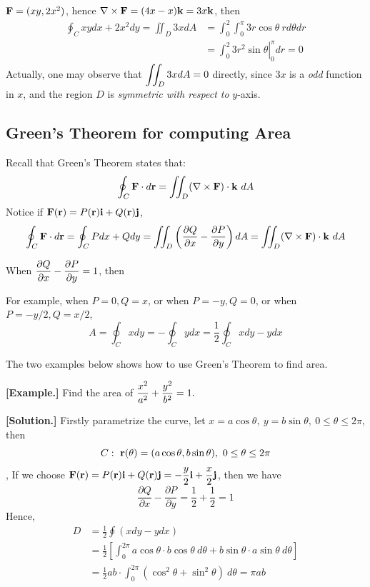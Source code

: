 \documentclass[11pt, a4paper]{MATH2023}
\newcommand{\eg}{\textbf{[Example.] }}
\newcommand{\sol}{\textbf{[Solution.] }}
\newcommand{\ii}{{\bf i}}
\newcommand{\jj}{{\bf j}}
\newcommand{\kk}{{\bf k}}
\newcommand{\rr}{{\bf r}}
\newcommand{\FF}{{\bf F}}
\newcommand{\pt}{\partial}
\begin{document}
\begin{spacing}{1.3}
    $\FF=(xy, 2x^2)$, hence $\nabla \times \FF=(4x-x)\kk =3x\kk$, then
    \begin{align*}
        \oint_{C} x y d x+2 x^{2} d y = \iint_D 3x dA &=\int_0^2\int_0^{\pi} 3r\cos\theta \ rd\theta dr \\
            &= \left. \int_0^2 3r^2\sin\theta \right|_0^{\pi} dr=0
    \end{align*}
    Actually, one may observe that $\displaystyle \iint_D 3x dA=0$ directly, since $3x$ is a {\it odd} function in 
    $x$, and the region $D$ is {\it symmetric with respect to }$y$-axis.



    \newpage
    \subsection{Green's Theorem for computing Area}

    Recall that Green's Theorem states that:
    $$\oint_C \FF\cdot d\rr=\iint_D (\nabla \times \FF)\cdot \kk\ dA$$
    Notice if $\FF(\rr)=P(\rr)\ii+Q(\rr)\jj$,
    $$\oint_{C} \mathbf{F} \cdot d \mathbf{r}=\oint_{C} P d x+Q d y
    =\iint_{D}\left(\frac{\partial Q}{\partial x}-\frac{\partial P}{\partial y}\right) d A
    =\iint_D (\nabla \times \FF)\cdot \kk\ dA$$

    When $\disp \frac{\pt Q}{\pt x}-\frac{\pt P}{\pt y}=1$, then 
    \begin{center}
    \end{center}

    For example, when $P=0, Q=x$, or when $P=-y, Q=0$, or when $P=-y/2, Q=x/2$,
    $$A=\oint_C xdy=-\oint_C ydx=\frac{1}{2}\oint_C xdy-ydx$$



    \newpage
    {\blue The two examples below shows how to use Green's Theorem to find area.}

    \eg Find the area of $\displaystyle \frac{x^2}{a^2}+\frac{y^2}{b^2}=1.$

    \sol Firstly parametrize the curve, let $x=a\cos\theta,\ y=b\sin\theta,\ 0\le \theta\le 2\pi$, then 
    $$C:\ \rr(\theta)=(a\cos\theta, b\sin\theta),\ 0\le \theta\le 2\pi$$,
    If we choose $\disp \FF(\rr)=P(\rr)\ii+Q(\rr)\jj=-\frac{y}{2}\ii+\frac{x}{2}\jj$, then we have
    $$\frac{\pt Q}{\pt x}-\frac{\pt P}{\pt y}=\frac{1}{2}+\frac{1}{2}=1$$
    Hence, 
    \begin{align*}
        D &= \frac{1}{2} \oint (xdy-ydx)\\
        &= \frac{1}{2} \left[ \int_0^{2\pi} a\cos\theta\cdot b\cos\theta\ d\theta 
        + b\sin\theta\cdot a\sin\theta\ d\theta \right]\\
        &= \frac{1}{2} ab \cdot \int_0^{2\pi} (\cos^2\theta+\sin^2\theta)\ d\theta =\pi ab
    \end{align*}



\end{spacing}
\end{document}
